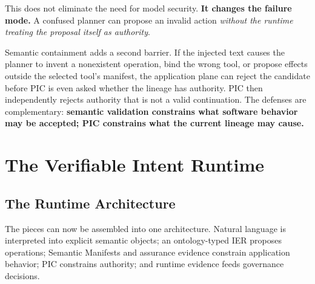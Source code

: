 \documentclass[10pt,oneside,openany]{book}
\begin{document}
This does not eliminate the need for model security. \textbf{It changes the failure mode.} A confused planner can propose an invalid action \emph{without the runtime treating the proposal itself as authority}.

Semantic containment adds a second barrier. If the injected text causes the planner to invent a nonexistent operation, bind the wrong tool, or propose effects outside the selected tool's manifest, the application plane can reject the candidate before PIC is even asked whether the lineage has authority. PIC then independently rejects authority that is not a valid continuation. The defenses are complementary: \textbf{semantic validation constrains what software behavior may be accepted; PIC constrains what the current lineage may cause.}

\part{The Verifiable Intent Runtime}

\chapter{The Runtime Architecture}

The pieces can now be assembled into one architecture. Natural language is interpreted into explicit semantic objects; an ontology-typed IER proposes operations; Semantic Manifests and assurance evidence constrain application behavior; PIC constrains authority; and runtime evidence feeds governance decisions.
\end{document}
